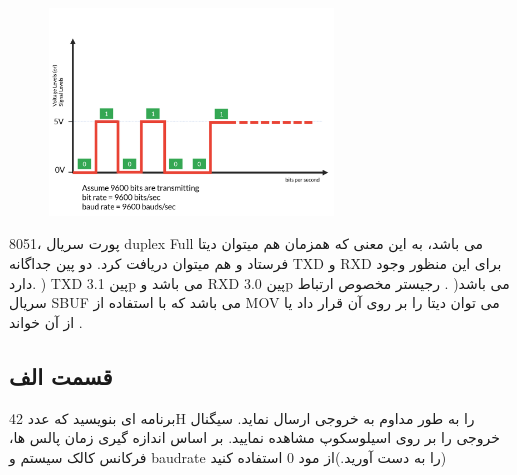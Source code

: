 \documentclass[11pt]{article}
\begin{document}
\begin{figure}[h!]
	\centering
	\includegraphics[height=5.5cm]{result/Bitrateequalbaudrate.png}
\end{figure}


پورت سریال ،8051 duplex Full می باشد، به این معنی که همزمان هم میتوان دیتا
فرستاد و هم میتوان دریافت کرد. دو پین جداگانه TXD و RXD برای این منظور وجود
دارد.
) TXD پین 3.1p می باشد و RXD پین 3.0p می باشد( . رجیستر مخصوص ارتباط سریال
SBUF می باشد که با استفاده از MOV می توان دیتا را بر روی آن قرار داد یا از آن خواند .

\clearpage

\subsection{قسمت الف}

 برنامه ای بنویسید که عدد 42H را به طور مداوم به خروجی ارسال نماید. سیگنال
خروجی را بر روی اسیلوسکوپ مشاهده نمایید. بر اساس اندازه گیری زمان پالس ها،
فرکانس کالک سیستم و baudrate را به دست آورید.)از مود 0 استفاده کنید)
\end{document}

